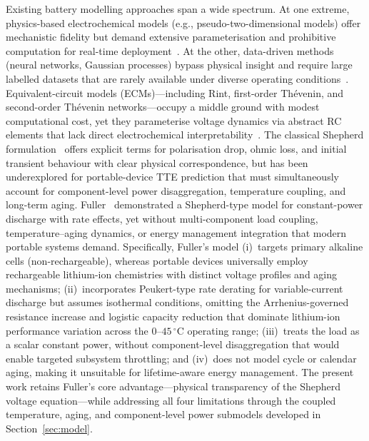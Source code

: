 \documentclass[5p,times,number]{elsarticle}
\newcommand{\secref}[1]{\textcolor{supercolor}{Section~\ref{#1}}}
\begin{document}
Existing battery modelling approaches span a wide spectrum.
At one extreme, physics-based electrochemical models (e.g., pseudo-two-dimensional models) offer mechanistic fidelity but demand extensive parameterisation and prohibitive computation for real-time deployment~\cite{Doyle1993,Newman2004,Mama2025}.
At the other, data-driven methods (neural networks, Gaussian processes) bypass physical insight and require large labelled datasets that are rarely available under diverse operating conditions~\cite{Chemali2018,Richardson2017,Xu2012ECM}.
Equivalent-circuit models (ECMs)---including Rint, first-order Th\'{e}venin, and second-order Th\'{e}venin networks---occupy a middle ground with modest computational cost, yet they parameterise voltage dynamics via abstract RC elements that lack direct electrochemical interpretability~\cite{Hu2012,You2018,He2012ECM}.
The classical Shepherd formulation~\cite{Shepherd1965} offers explicit terms for polarisation drop, ohmic loss, and initial transient behaviour with clear physical correspondence, but has been underexplored for portable-device TTE prediction that must simultaneously account for component-level power disaggregation, temperature coupling, and long-term aging.
Fuller~\cite{Fuller2014} demonstrated a Shepherd-type model for constant-power discharge with rate effects, yet without multi-component load coupling, temperature--aging dynamics, or energy management integration that modern portable systems demand.
Specifically, Fuller's model (i)~targets primary alkaline cells (non-rechargeable), whereas portable devices universally employ rechargeable lithium-ion chemistries with distinct voltage profiles and aging mechanisms; (ii)~incorporates Peukert-type rate derating for variable-current discharge but assumes isothermal conditions, omitting the Arrhenius-governed resistance increase and logistic capacity reduction that dominate lithium-ion performance variation across the $0$--$45\,^{\circ}$C operating range; (iii)~treats the load as a scalar constant power, without component-level disaggregation that would enable targeted subsystem throttling; and (iv)~does not model cycle or calendar aging, making it unsuitable for lifetime-aware energy management.
The present work retains Fuller's core advantage---physical transparency of the Shepherd voltage equation---while addressing all four limitations through the coupled temperature, aging, and component-level power submodels developed in \secref{sec:model}.
\end{document}
